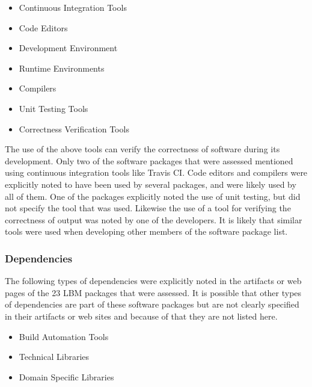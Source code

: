 \documentclass[12pt, notitlepage]{article}
\begin{document}
\begin{singlespace}
	\begin{multicols}{2}	
		\begin{itemize}
			\item Continuous Integration Tools
			\item Code Editors
			\item Development Environment
			\item Runtime Environments
			\item Compilers
			\item Unit Testing Tools
			\item Correctness Verification Tools
		\end{itemize}
	\end{multicols}
\end{singlespace}

The use of the above tools can verify the correctness of software during its development. Only two of the software packages that were assessed mentioned using continuous integration tools like Travis CI. Code editors and compilers were explicitly noted to have been used by several packages, and were likely used by all of them. One of the packages explicitly noted the use of unit testing, but did not specify the tool that was used. Likewise the use of a tool for verifying the correctness of output was noted by one of the developers. It is likely that similar tools were used when developing other members of the software package list. 

\subsubsection{Dependencies}

The following types of dependencies were explicitly noted in the artifacts or web pages of the 23 LBM packages that were assessed. It is possible that other types of dependencies are part of these software packages but are not clearly specified in their artifacts or web sites and because of that they are not listed here.

\begin{singlespace}
	\begin{multicols}{2}	
		\begin{itemize}
			\item Build Automation Tools
			\item Technical Libraries
			\item Domain Specific Libraries
		\end{itemize}
	\end{multicols}
\end{singlespace}
\end{document}
